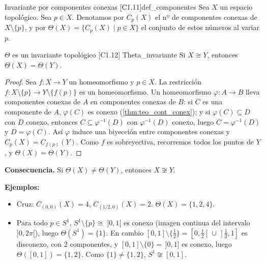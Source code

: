 \begin{definicion}{Invariante por componentes conexas [C1.11]}{def_componentes}
Sea $X$ un espacio topológico. Sea $p \in X$. Denotamos por $C_p(X)$ el nº de componentes conexas de $X \setminus \{p\}$, y por $\Theta(X) = \{C_p(X) \mid p \in X\}$ el conjunto de estos números al variar $p$.
\end{definicion}

\begin{proposicion}{$\Theta$ es un invariante topológico [C1.12] \marcaE}{Theta_invariante}
Si $X \cong Y$, entonces $\Theta(X) = \Theta(Y)$.
\end{proposicion}
 
\begin{proof}
Sea $f \colon X \to Y$ un homeomorfismo y $p \in X$. La restricción $f \colon X \setminus \{p\} \to Y \setminus \{f(p)\}$ es un homeomorfismo. Un homeomorfismo $\varphi \colon A \to B$ lleva componentes conexas de $A$ en componentes conexas de $B$: si $C$ es una componente de $A$, $\varphi(C)$ es conexo (\cref{thm:teo_cont_conex}); y si $\varphi(C) \subseteq D$ con $D$ conexo, entonces $C \subseteq \varphi^{-1}(D)$ con $\varphi^{-1}(D)$ conexo, luego $C = \varphi^{-1}(D)$ y $D = \varphi(C)$. Así $\varphi$ induce una biyección entre componentes conexas y $C_p(X) = C_{f(p)}(Y)$. Como $f$ es sobreyectiva, recorremos todos los puntos de $Y$, y $\Theta(X) = \Theta(Y)$.
\end{proof}
 
\textbf{Consecuencia.} Si $\Theta(X) \neq \Theta(Y)$, entonces $X \not\cong Y$.
 
\textbf{Ejemplos:}
\begin{itemize}
    \item Cruz: $C_{(0,0)}(X) = 4$, $C_{(1/2,0)}(X) = 2$. $\Theta(X) = \{1,2,4\}$.
    
    \begin{center}
    \end{center}
    
    \item Para todo $p \in S^1$, $S^1 \setminus \{p\} \cong\; ]0,1[$ es conexo (imagen continua del intervalo $]0,2\pi[$), luego $\Theta(S^1) = \{1\}$. En cambio $[0,1] \setminus \{\frac12\} = [0,\frac12[\, \cup\, ]\frac12,1]$ es disconexo, con $2$ componentes, y $[0,1] \setminus \{0\} = \,]0,1]$ es conexo, luego $\Theta([0,1]) = \{1,2\}$. Como $\{1\} \neq \{1,2\}$, $S^1 \not\cong [0,1]$.
 
\end{itemize}

